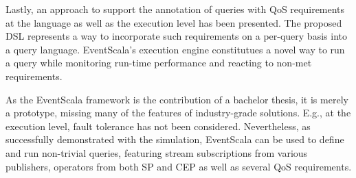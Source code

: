 \documentclass[article, 10pt, type=bsc, colorback, accentcolor=tud8b, parskip=half, bibliography=totocnumbered]{tudthesis}
\begin{document}
Lastly, an approach to support the annotation of queries with QoS requirements at the language as well as the execution level has been presented.
The proposed DSL represents a way to incorporate such requirements on a per-query basis into a query language.
EventScala's execution engine constitutues a novel way to run a query while monitoring run-time performance and reacting to non-met requirements.

As the EventScala framework is the contribution of a bachelor thesis, it is merely a prototype, missing many of the features of industry-grade solutions. E.g., at the execution level, fault tolerance has not been considered. Nevertheless, as successfully demonstrated with the simulation, EventScala can be used to define and run non-trivial queries, featuring stream subscriptions from various publishers, operators from both SP and CEP as well as several QoS requirements.

\newpage

\printbibliography
\end{document}
